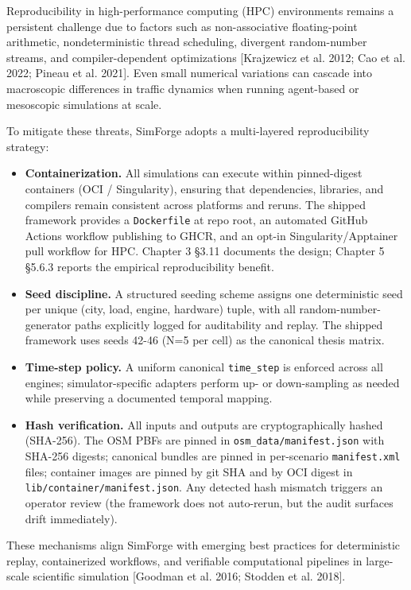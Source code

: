 Reproducibility in high-performance computing (HPC) environments remains
a persistent challenge due to factors such as non-associative
floating-point arithmetic, nondeterministic thread scheduling, divergent
random-number streams, and compiler-dependent optimizations
{[}Krajzewicz et al. 2012; Cao et al. 2022; Pineau et al. 2021{]}. Even
small numerical variations can cascade into macroscopic differences in
traffic dynamics when running agent-based or mesoscopic simulations at
scale.

To mitigate these threats, SimForge adopts a multi-layered
reproducibility strategy:

\begin{itemize}
\item
  \textbf{Containerization.} All simulations can execute within
  pinned-digest containers (OCI / Singularity), ensuring that
  dependencies, libraries, and compilers remain consistent across
  platforms and reruns. The shipped framework provides a
  \texttt{Dockerfile} at repo root, an automated GitHub Actions workflow
  publishing to GHCR, and an opt-in Singularity/Apptainer pull workflow
  for HPC. Chapter 3 §3.11 documents the design; Chapter 5 §5.6.3
  reports the empirical reproducibility benefit.
\item
  \textbf{Seed discipline.} A structured seeding scheme assigns one
  deterministic seed per unique (city, load, engine, hardware) tuple,
  with all random-number-generator paths explicitly logged for
  auditability and replay. The shipped framework uses seeds 42-46 (N=5
  per cell) as the canonical thesis matrix.
\item
  \textbf{Time-step policy.} A uniform canonical \texttt{time\_step} is
  enforced across all engines; simulator-specific adapters perform up-
  or down-sampling as needed while preserving a documented temporal
  mapping.
\item
  \textbf{Hash verification.} All inputs and outputs are
  cryptographically hashed (SHA-256). The OSM PBFs are pinned in
  \texttt{osm\_data/manifest.json} with SHA-256 digests; canonical
  bundles are pinned in per-scenario \texttt{manifest.xml} files;
  container images are pinned by git SHA and by OCI digest in
  \texttt{lib/container/manifest.json}. Any detected hash mismatch
  triggers an operator review (the framework does not auto-rerun, but
  the audit surfaces drift immediately).
\end{itemize}

These mechanisms align SimForge with emerging best practices for
deterministic replay, containerized workflows, and verifiable
computational pipelines in large-scale scientific simulation {[}Goodman
et al. 2016; Stodden et al. 2018{]}.

